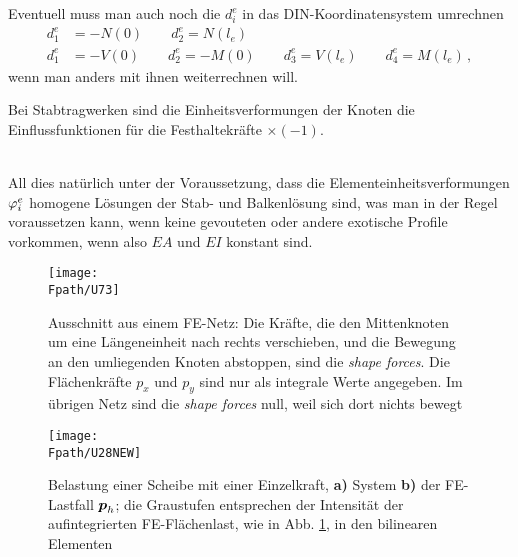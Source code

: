 Eventuell muss man auch noch die $d_i^e$ in das DIN-Koordinatensystem umrechnen
\begin{align}
d_1^e &= - N(0) \qquad d_2^e = N(l_e) \\
d_1^e &= - V(0) \qquad d_2^e = - M(0) \qquad d_3^e = V(l_e) \qquad d_4^e = M(l_e) \,,
\end{align}
wenn man anders mit ihnen weiterrechnen will.\\

\hspace*{-12pt}\colorbox{highlightBlue}{\parbox{0.98\textwidth}{Bei Stabtragwerken sind die Einheitsverformungen der Knoten die Einflussfunktionen f\"{u}r die Festhaltekr\"{a}fte $\times (-1)$.}}\\

All dies nat\"{u}rlich unter der Voraussetzung, dass die Elementeinheitsverformungen $\varphi_i^e$ homogene L\"{o}sungen der Stab- und Balkenl\"{o}sung sind, was man in der Regel voraussetzen kann, wenn keine gevouteten oder andere exotische Profile vorkommen, wenn also $EA$ und $EI$ konstant sind.

\begin{figure}[tbp]
\centering
\if {} \sidecaption \fi
\texttt{[image: \\Fpath/U73]}
\caption{Ausschnitt aus einem FE-Netz: Die Kr\"{a}fte, die den Mittenknoten um eine L\"{a}ngeneinheit nach rechts verschieben, und die Bewegung an den umliegenden Knoten abstoppen, sind die {\em shape forces\/}. Die Fl\"{a}chenkr\"{a}fte $p_x$ und $p_y$ sind nur als integrale Werte angegeben. Im \"{u}brigen Netz sind die {\em shape forces\/} null, weil sich dort nichts bewegt} \label{U73}
\end{figure}%

\begin{figure}[tbp]
\centering
\if {} \sidecaption \fi
\texttt{[image: \\Fpath/U28NEW]}
\caption{Belastung einer Scheibe mit einer Einzelkraft, {\bf a)} System {\bf b)} der FE-Lastfall $\mbox{\boldmath $p$}_h$; die Graustufen entsprechen der Intensit\"{a}t der aufintegrierten FE-Fl\"{a}chenlast, wie in Abb. \ref{U73}, in den bilinearen Elementen} \label{U28}
\end{figure}%

